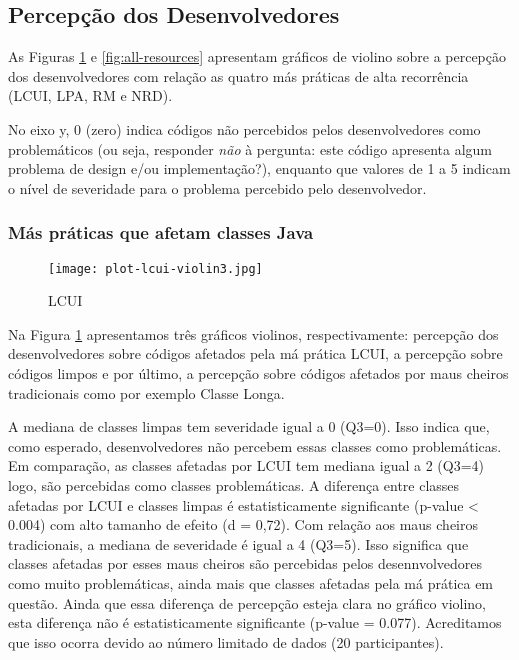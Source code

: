 \subsection{Percepção dos Desenvolvedores}
As Figuras \ref{fig:lcui} e \ref{fig:all-resources} apresentam gráficos de violino sobre a percepção dos desenvolvedores com relação as quatro más práticas de alta recorrência (LCUI, LPA, RM e NRD). 

No eixo y, 0 (zero) indica códigos não percebidos pelos desenvolvedores como problemáticos (ou seja, responder \emph{não} à pergunta: este código apresenta algum problema de design e/ou implementação?), enquanto que valores de 1 a 5 indicam o nível de severidade para o problema percebido pelo desenvolvedor.

\subsubsection{Más práticas que afetam classes Java}
\begin{figure}
	\centering
	\texttt{[image: plot-lcui-violin3.jpg]}
	\caption{LCUI}
	\label{fig:lcui}
\end{figure}

Na Figura \ref{fig:lcui} apresentamos três gráficos violinos, respectivamente: percepção dos desenvolvedores sobre códigos afetados pela má prática LCUI, a percepção sobre códigos limpos e por último, a percepção sobre códigos afetados por maus cheiros tradicionais como por exemplo Classe Longa. 

A mediana de classes limpas tem severidade igual a 0 (Q3=0). Isso indica que, como esperado, desenvolvedores não percebem essas classes como problemáticas. Em comparação, as classes afetadas por LCUI tem mediana igual a 2 (Q3=4) logo, são percebidas como classes problemáticas. A diferença entre classes afetadas por LCUI e classes limpas é estatisticamente significante (p-value < 0.004) com alto tamanho de efeito (d = 0,72). Com relação aos maus cheiros tradicionais, a mediana de severidade é igual a 4 (Q3=5). Isso significa que classes afetadas por esses maus cheiros são percebidas pelos desennvolvedores como muito problemáticas, ainda mais que classes afetadas pela má prática em questão. Ainda que essa diferença de percepção esteja clara no gráfico violino, esta diferença não é estatisticamente significante (p-value = 0.077). Acreditamos que isso ocorra devido ao número limitado de dados (20 participantes).

